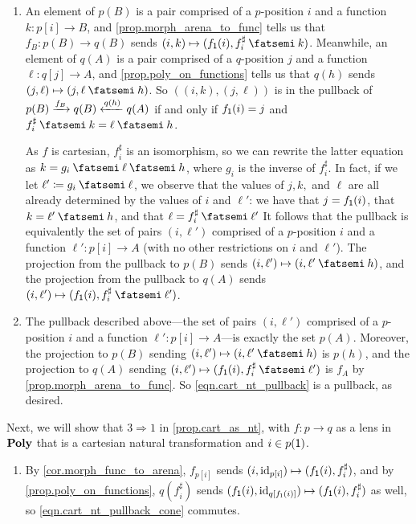 \documentclass[Book-Poly]{subfiles}
\begin{document}
\begin{exercise}
\begin{solution}
\begin{enumerate}
    \item An element of $p(B)$ is a pair comprised of a $p$-position $i$ and a function $k\colon p[i]\to B$, and \cref{prop.morph_arena_to_func} tells us that $f_B\colon p(B)\to q(B)$ sends $(i,k)\mapsto(f_\1(i),f^\sharp_i\then k)$.
    Meanwhile, an element of $q(A)$ is a pair comprised of a $q$-position $j$ and a function $\ell\colon q[j]\to A$, and \cref{prop.poly_on_functions} tells us that $q(h)$ sends $(j,\ell)\mapsto(j,\ell\then h)$.
    So $((i,k),(j,\ell))$ is in the pullback of $p(B)\xrightarrow{f_B}q(B)\xleftarrow{q(h)}q(A)$ if and only if $f_{\textsf{1}}(i)=j$ and $f^\sharp_i\then k=\ell\then h$.
    
    As $f$ is cartesian, $f^\sharp_i$ is an isomorphism, so we can rewrite the latter equation as $k=g_i\then\ell\then h$, where $g_i$ is the inverse of $f^\sharp_i$.
    In fact, if we let $\ell'\coloneqq g_i\then\ell$, we observe that the values of $j,k,$ and $\ell$ are all already determined by the values of $i$ and $\ell'$: we have that $j=f_{\textsf{1}}(i)$, that $k=\ell'\then h$, and that $\ell=f^\sharp_i\then\ell'$
    It follows that the pullback is equivalently the set of pairs $(i,\ell')$ comprised of a $p$-position $i$ and a function $\ell'\colon p[i]\to A$ (with no other restrictions on $i$ and $\ell'$).
    The projection from the pullback to $p(B)$ sends $(i,\ell')\mapsto(i,\ell'\then h)$, and the projection from the pullback to $q(A)$ sends $(i,\ell')\mapsto(f_\1(i),f^\sharp_i\then\ell')$.
    \item The pullback described above---the set of pairs $(i,\ell')$ comprised of a $p$-position $i$ and a function $\ell'\colon p[i]\to A$---is exactly the set $p(A)$.
    Moreover, the projection to $p(B)$ sending $(i,\ell')\mapsto(i,\ell'\then h)$ is $p(h)$, and the projection to $q(A)$ sending $(i,\ell')\mapsto(f_\1(i),f^\sharp_i\then\ell')$ is $f_A$ by \cref{prop.morph_arena_to_func}.
    So \eqref{eqn.cart_nt_pullback} is a pullback, as desired.
\end{enumerate}
Next, we will show that $3\Rightarrow1$ in \cref{prop.cart_as_nt}, with $f\colon p\to q$ as a lens in $\mathbf{Poly}$ that is a cartesian natural transformation and $i\in p(\textsf{1})$.
\begin{enumerate}[resume]
    \item By \cref{cor.morph_func_to_arena}, $f_{p[i]}$ sends $(i,\mathrm{id}_{p[i]})\mapsto(f_{\textsf{1}}(i),f^\sharp_i)$, and by \cref{prop.poly_on_functions}, $q(f^\sharp_i)$ sends $(f_{\textsf{1}}(i),\mathrm{id}_{q[f_{\textsf{1}}(i)]})\mapsto(f_{\textsf{1}}(i),f^\sharp_i)$ as well, so \eqref{eqn.cart_nt_pullback_cone} commutes.
    

\end{enumerate}
\end{solution}
\end{exercise}
\end{document}
